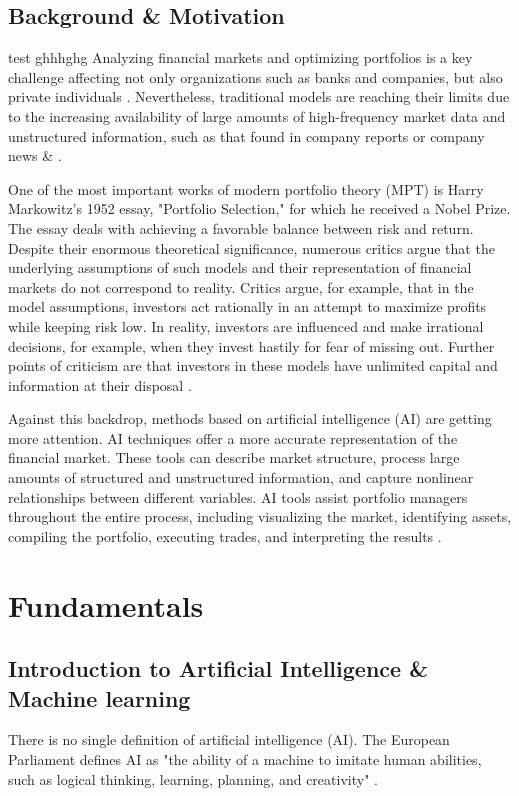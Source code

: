 \documentclass{agasthesis}
\begin{document}
\section{Background & Motivation}test
ghhhghg
Analyzing financial markets and optimizing portfolios is a key challenge affecting not only organizations such as banks and companies, 
but also private individuals \cite{salo_fifty_2024}. Nevertheless, 
traditional models are reaching their limits due to the increasing availability of large amounts of high-frequency market data and unstructured information, 
such as that found in company reports or company news \cite{zhang_novel_2023} \& \cite{guo_textual_2016}.

One of the most important works of modern portfolio theory (MPT) is Harry Markowitz's 1952 essay, 
"Portfolio Selection," for which he received a Nobel Prize. The essay deals with achieving a favorable balance between risk and return. 
Despite their enormous theoretical significance, numerous critics argue that the underlying assumptions of such models and their representation of financial markets 
do not correspond to reality. Critics argue, for example, that in the model assumptions, investors act rationally in an attempt to maximize profits while keeping risk low. 
In reality, investors are influenced and make irrational decisions, for example, when they invest hastily for fear of missing out. Further points of criticism are that investors 
in these models have unlimited capital and information at their disposal \cite{mangram_simplified_2013}.

Against this backdrop, methods based on artificial intelligence (AI) are getting more attention. AI techniques offer a more accurate representation of the financial market. 
These tools can describe market structure, process large amounts of structured and unstructured information, and capture nonlinear relationships between different variables. 
AI tools assist portfolio managers throughout the entire process, 
including visualizing the market, identifying assets, compiling the portfolio, executing trades, and interpreting the results \cite{sutiene_enhancing_2024}.
\chapter{Fundamentals}
\section{Introduction to Artificial Intelligence & Machine learning}
There is no single definition of artificial intelligence (AI). The European Parliament defines AI as "the ability of a machine to imitate human abilities, 
such as logical thinking, learning, planning, and creativity" \cite[p. 98]{seidel_banking_2025}.
\end{document}
